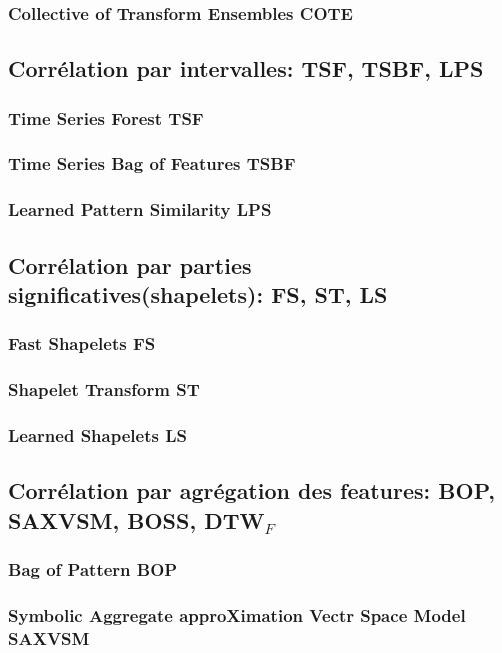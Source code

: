\documentclass[onecolumn, 12pt]{book}
\begin{document}
			\subsubsection{Collective of Transform Ensembles COTE}
			\subsubsection{}
		\subsection{Corr\'elation par intervalles: TSF, TSBF, LPS}
			\subsubsection{Time Series Forest TSF}
			\subsubsection{Time Series Bag of Features TSBF}
			\subsubsection{Learned Pattern Similarity LPS}
		\subsection{Corr\'elation par parties significatives(shapelets): FS, ST, LS}
			\subsubsection{Fast Shapelets FS}
			\subsubsection{Shapelet Transform ST}
			\subsubsection{Learned Shapelets LS}
		\subsection{Corr\'elation par agr\'egation des features: BOP, SAXVSM, BOSS,  DTW$_{F}$}
			\subsubsection{Bag of Pattern BOP}
			\subsubsection{Symbolic Aggregate approXimation Vectr Space Model SAXVSM}
\end{document}
